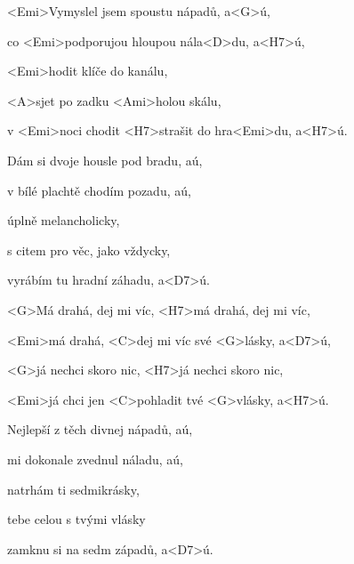 

\zs
<Emi>Vymyslel jsem spoustu nápadů, a<G>ú,

co <Emi>podporujou hloupou nála<D>du, a<H7>ú,

<Emi>hodit klíče do kanálu,

<A>sjet po zadku <Ami>holou skálu,

v <Emi>noci chodit <H7>strašit do hra<Emi>du, a<H7>ú.
\ks

\zs
Dám si dvoje housle pod bradu, aú,

v bílé plachtě chodím pozadu, aú,

úplně melancholicky,

s citem pro věc, jako vždycky,

vyrábím tu hradní záhadu, a<D7>ú.
\ks

\zr
<G>Má drahá, dej mi víc, <H7>má drahá, dej mi víc,

<Emi>má drahá, <C>dej mi víc své <G>lásky, a<D7>ú,

<G>já nechci skoro nic, <H7>já nechci skoro nic,

<Emi>já chci jen <C>pohladit tvé <G>vlásky, a<H7>ú.
\kr

\zs
Nejlepší z těch divnej nápadů, aú,

mi dokonale zvednul náladu, aú,

natrhám ti sedmikrásky,

tebe celou s tvými vlásky

zamknu si na sedm západů, a<D7>ú.
\ks

\zr \kr

\kp
